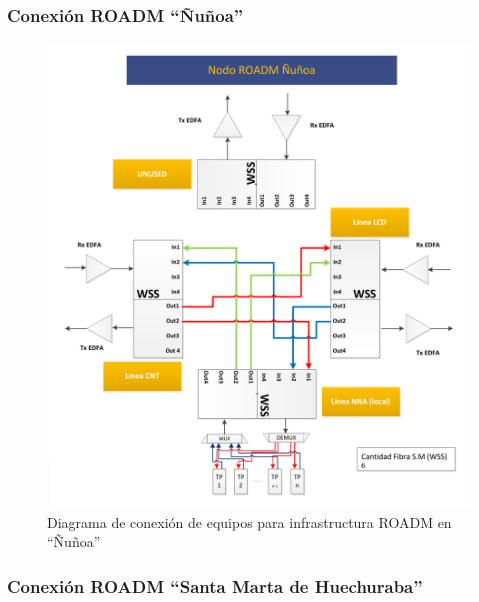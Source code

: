 \subsubsection{Conexión ROADM ``Ñuñoa''}
\label{sec:drnna}

\begin{figure}[H]
  \centering
  \includegraphics[width=17cm]{Imagenes/NNA.pdf}
  \caption{Diagrama de conexión de equipos para infrastructura ROADM en ``Ñuñoa''}
  \label{fig:drnna}
\end{figure}

\subsubsection{Conexión ROADM ``Santa Marta de Huechuraba''}
\label{sec:drsmh}

